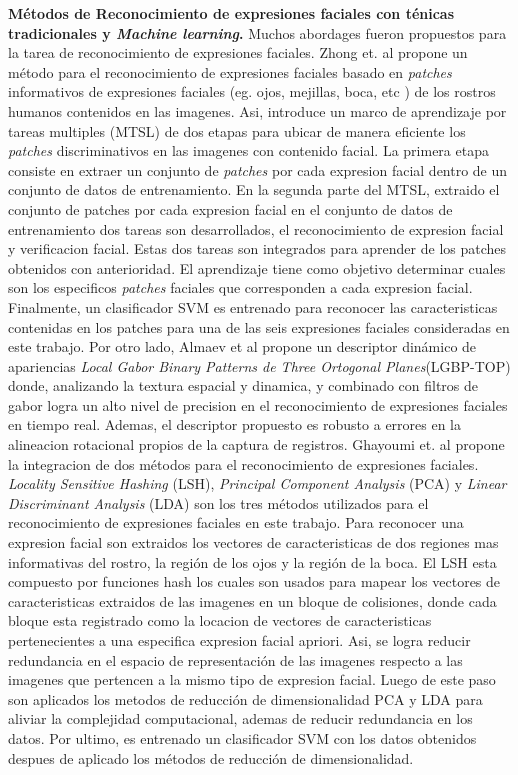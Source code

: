 \vspace{1cm}
\textbf{Métodos de Reconocimiento de expresiones faciales con ténicas tradicionales y \textit{Machine learning}.} 
Muchos abordages fueron propuestos para la tarea de reconocimiento de expresiones faciales. Zhong et. al   \cite{zhong2012learning} propone un método para el reconocimiento de expresiones faciales basado en \textit{patches} informativos de expresiones faciales (eg. ojos, mejillas, boca, etc ) de los rostros humanos contenidos en las imagenes. Asi, introduce un marco de aprendizaje por tareas multiples (MTSL) de dos etapas para ubicar de manera eficiente los \textit{patches} discriminativos en las imagenes con contenido facial. La primera etapa consiste en extraer un conjunto de \textit{patches} por cada expresion facial dentro de un conjunto de datos de entrenamiento. En la segunda parte del MTSL, extraido el conjunto  de patches por cada expresion facial en el conjunto de datos de entrenamiento dos tareas son desarrollados, el reconocimiento de expresion facial y verificacion facial.  Estas dos tareas son integrados para aprender de los patches obtenidos con anterioridad. El aprendizaje tiene como objetivo determinar cuales son los especificos \textit{patches} faciales que corresponden a cada expresion facial. Finalmente, un clasificador SVM es entrenado para reconocer las caracteristicas contenidas en los patches para una de las seis expresiones faciales consideradas en este trabajo. Por otro lado, Almaev et al \cite{almaev2013local} propone un descriptor dinámico de apariencias \textit{Local Gabor Binary Patterns de Three Ortogonal Planes}(LGBP-TOP) donde, analizando la textura espacial y dinamica, y combinado con filtros de gabor logra un alto nivel de precision en el reconocimiento de expresiones faciales en tiempo real. Ademas, el descriptor propuesto es robusto a errores en la alineacion rotacional propios de la captura de registros.
Ghayoumi et. al \cite{ghayoumi2014integrated} propone la integracion de dos métodos para el reconocimiento de expresiones faciales. \textit{Locality Sensitive Hashing} (LSH), \textit{Principal Component Analysis} (PCA) y \textit{Linear Discriminant Analysis} (LDA)  son los tres métodos utilizados para el reconocimiento de expresiones faciales en este trabajo.
Para reconocer una expresion facial son extraidos los vectores de caracteristicas de dos regiones mas informativas del rostro, la región de los ojos y la región de la boca. El LSH esta compuesto por funciones hash los cuales son usados para mapear los vectores de caracteristicas extraidos de las imagenes en un bloque de colisiones, donde cada bloque esta registrado como la locacion de vectores de caracteristicas pertenecientes a una especifica expresion facial apriori. Asi, se logra reducir redundancia en el espacio de representación de las imagenes respecto a las imagenes que pertencen a la mismo tipo de expresion facial. Luego de este paso son aplicados los metodos de reducción de dimensionalidad PCA y LDA  para aliviar la complejidad computacional, ademas de reducir redundancia en los datos. Por ultimo, es entrenado un clasificador SVM con los datos obtenidos despues de aplicado los métodos de reducción de dimensionalidad.



